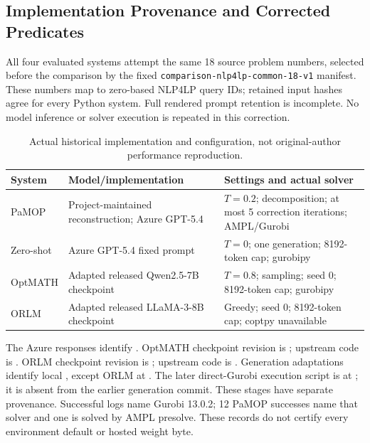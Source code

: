 \subsection{Implementation Provenance and Corrected Predicates}
All four evaluated systems attempt the same 18 source problem numbers, selected before the comparison by the fixed \texttt{comparison-nlp4lp-common-18-v1} manifest. These numbers map to zero-based NLP4LP query IDs; retained input hashes agree for every Python system. Full rendered prompt retention is incomplete. No model inference or solver execution is repeated in this correction.

\begin{table}[htbp]\centering\small
\caption{Actual historical implementation and configuration, not original-author performance reproduction.}\label{tab:llm-provenance}
\begin{tabularx}{\linewidth}{@{}lXX@{}}\toprule
System & Model/implementation & Settings and actual solver\\\midrule
PaMOP & Project-maintained reconstruction; Azure GPT-5.4 & $T=0.2$; decomposition; at most 5 correction iterations; AMPL/Gurobi\\
Zero-shot & Azure GPT-5.4 fixed prompt & $T=0$; one generation; 8192-token cap; gurobipy\\
OptMATH & Adapted released Qwen2.5-7B checkpoint & $T=0.8$; sampling; seed 0; 8192-token cap; gurobipy\\
ORLM & Adapted released LLaMA-3-8B checkpoint & Greedy; seed 0; 8192-token cap; coptpy unavailable\\\bottomrule
\end{tabularx}\end{table}
The Azure responses identify . OptMATH checkpoint revision is ; upstream code is . ORLM checkpoint revision is ; upstream code is . Generation adaptations identify local , except ORLM at . The later direct-Gurobi execution script is at ; it is absent from the earlier generation commit. These stages have separate provenance. Successful logs name Gurobi 13.0.2; 12 PaMOP successes name that solver and one is solved by AMPL presolve. These records do not certify every environment default or hosted weight byte.

